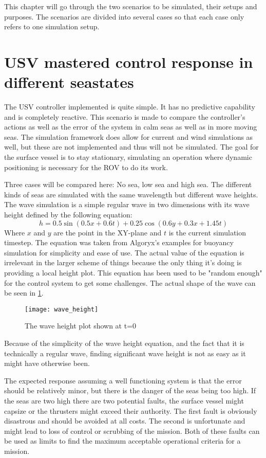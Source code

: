 \documentclass[class=article, crop=false, draft=true]{standalone}
\begin{document}
\label{chap:cases}
This chapter will go through the two scenarios to be simulated, their setups and purposes. The scenarios are divided into several cases so that each case only refers to one simulation setup.

\section{USV mastered control response in different seastates}
The USV controller implemented is quite simple. It has no predictive capability and is completely reactive. This scenario is made to compare the controller's actions as well as the error of the system in calm seas as well as in more moving seas. The simulation framework does allow for current and wind simulations as well, but these are not implemented and thus will not be simulated. The goal for the surface vessel is to stay stationary, simulating an operation where dynamic positioning is necessary for the ROV to do its work.

Three cases will be compared here: No sea, low sea and high sea. The different kinds of seas are simulated with the same wavelength but different wave heights. The wave simulation is a simple regular wave in two dimensions with its wave height defined by the following equation:
\[h = 0.5\sin(0.5 x +0.6t) + 0.25\cos(0.6y + 0.3x + 1.45t)\]
Where \(x\) and \(y\) are the point in the XY-plane and \(t\) is the current simulation timestep. The equation was taken from Algoryx's examples for buoyancy simulation for simplicity and ease of use. The actual value of the equation is irrelevant in the larger scheme of things because the only thing it's doing is providing a local height plot. This equation has been used to be "random enough" for the control system to get some challenges. The actual shape of the wave can be seen in \cref{fig:waves}.

\begin{figure}
    \centering
    \texttt{[image: wave\_height]}
    \caption{The wave height plot shown at t=0}
    \label{fig:waves}
\end{figure}

Because of the simplicity of the wave height equation, and the fact that it is technically a regular wave, finding significant wave height is not as easy as it might have otherwise been.

The expected response assuming a well functioning system is that the error should be relatively minor, but there is the danger of the seas being too high. If the seas are two high there are two potential faults, the surface vessel might capsize or the thrusters might exceed their authority. The first fault is obviously disastrous and should be avoided at all costs. The second is unfortunate and might lead to loss of control or scrubbing of the mission. Both of these faults can be used as limits to find the maximum acceptable operational criteria for a mission.
\end{document}

